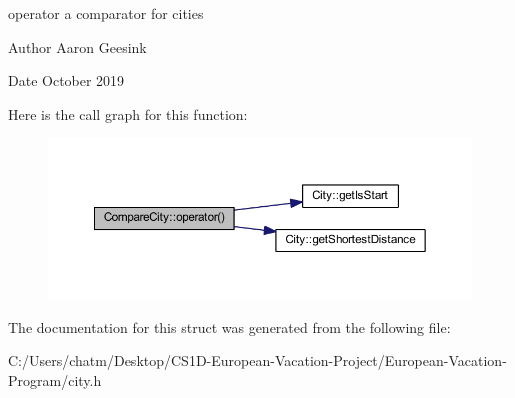 operator a comparator for cities 

\begin{DoxyAuthor}{Author}
Aaron Geesink 
\end{DoxyAuthor}
\begin{DoxyDate}{Date}
October 2019 
\end{DoxyDate}
Here is the call graph for this function\+:
\nopagebreak
\begin{figure}[H]
\begin{center}
\leavevmode
\includegraphics[width=350pt]{struct_compare_city_a08fbbcc6710ad653fdee21de31576d10_cgraph}
\end{center}
\end{figure}


The documentation for this struct was generated from the following file\+:\begin{DoxyCompactItemize}
\item 
C\+:/\+Users/chatm/\+Desktop/\+C\+S1\+D-\/\+European-\/\+Vacation-\/\+Project/\+European-\/\+Vacation-\/\+Program/city.\+h\end{DoxyCompactItemize}
